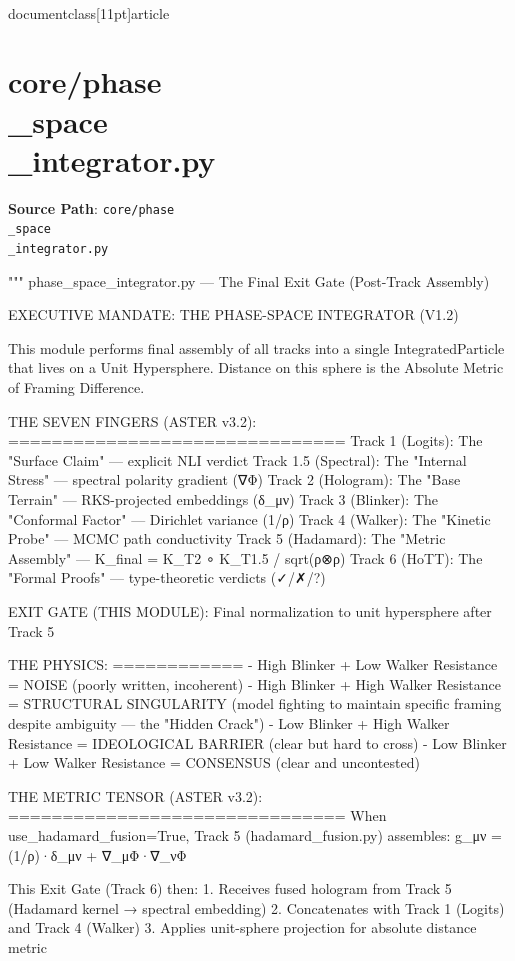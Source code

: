 \\documentclass[11pt]{article}
\begin{document}
\section*{core/phase\\_space\\_integrator.py}
\textbf{Source Path}: \texttt{core/phase\\_space\\_integrator.py}\par
\bigskip
\begin{CodeBlock}
"""
phase_space_integrator.py — The Final Exit Gate (Post-Track Assembly)

EXECUTIVE MANDATE: THE PHASE-SPACE INTEGRATOR (V1.2)

This module performs final assembly of all tracks into a single IntegratedParticle
that lives on a Unit Hypersphere. Distance on this sphere is the Absolute Metric
of Framing Difference.

THE SEVEN FINGERS (ASTER v3.2):
===============================
Track 1 (Logits):       The "Surface Claim" — explicit NLI verdict
Track 1.5 (Spectral):   The "Internal Stress" — spectral polarity gradient (∇Φ)
Track 2 (Hologram):     The "Base Terrain" — RKS-projected embeddings (δ_μν)
Track 3 (Blinker):      The "Conformal Factor" — Dirichlet variance (1/ρ)
Track 4 (Walker):       The "Kinetic Probe" — MCMC path conductivity
Track 5 (Hadamard):     The "Metric Assembly" — K_final = K_T2 ∘ K_T1.5 / sqrt(ρ⊗ρ)
Track 6 (HoTT):         The "Formal Proofs" — type-theoretic verdicts (✓/✗/?)

EXIT GATE (THIS MODULE): Final normalization to unit hypersphere after Track 5

THE PHYSICS:
============
- High Blinker + Low Walker Resistance = NOISE (poorly written, incoherent)
- High Blinker + High Walker Resistance = STRUCTURAL SINGULARITY (model fighting
  to maintain specific framing despite ambiguity — the "Hidden Crack")
- Low Blinker + High Walker Resistance = IDEOLOGICAL BARRIER (clear but hard to cross)
- Low Blinker + Low Walker Resistance = CONSENSUS (clear and uncontested)

THE METRIC TENSOR (ASTER v3.2):
===============================
When use_hadamard_fusion=True, Track 5 (hadamard_fusion.py) assembles:
    g_μν = (1/ρ)·δ_μν + ∇_μΦ·∇_νΦ

This Exit Gate (Track 6) then:
1. Receives fused hologram from Track 5 (Hadamard kernel → spectral embedding)
2. Concatenates with Track 1 (Logits) and Track 4 (Walker)
3. Applies unit-sphere projection for absolute distance metric


\end{CodeBlock}
\end{document}
